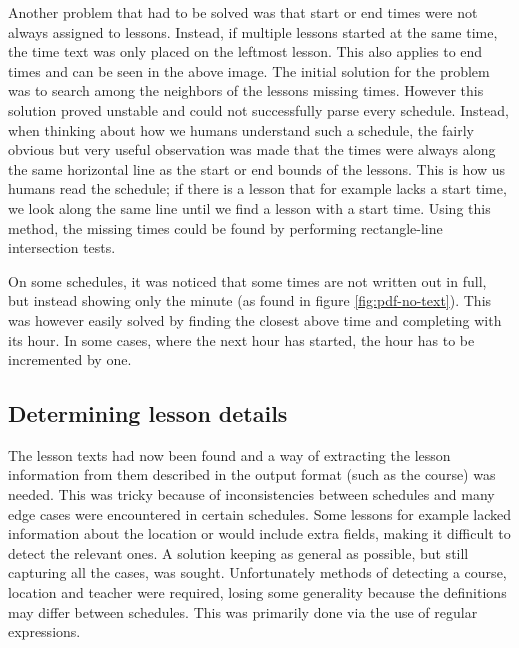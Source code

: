 \documentclass{article}
\begin{document}
	Another problem that had to be solved was that start or end times were not always assigned to lessons. Instead, if multiple lessons started at the same time, the time text was only placed on the leftmost lesson. This also applies to end times and can be seen in the above image. The initial solution for the problem was to search among the neighbors of the lessons missing times. However this solution proved unstable and could not successfully parse every schedule. Instead, when thinking about how we humans understand such a schedule, the fairly obvious but very useful observation was made that the times were always along the same horizontal line as the start or end bounds of the lessons. This is how us humans read the schedule; if there is a lesson that for example lacks a start time, we look along the same line until we find a lesson with a start time. Using this method, the missing times could be found by performing rectangle-line intersection tests.
	
	On some schedules, it was noticed that some times are not written out in full, but instead showing only the minute (as found in figure \ref{fig:pdf-no-text}). This was however easily solved by finding the closest above time and completing with its hour. In some cases, where the next hour has started, the hour has to be incremented by one.
	
	\subsection{Determining lesson details}
	The lesson texts had now been found and a way of extracting the lesson information from them described in the output format (such as the course) was needed. This was tricky because of inconsistencies between schedules and many edge cases were encountered in certain schedules. Some lessons for example lacked information about the location or would include extra fields, making it difficult to detect the relevant ones. A solution keeping as general as possible, but still capturing all the cases, was sought. Unfortunately methods of detecting a course, location and teacher were required, losing some generality because the definitions may differ between schedules. This was primarily done via the use of regular expressions.
	
\end{document}
